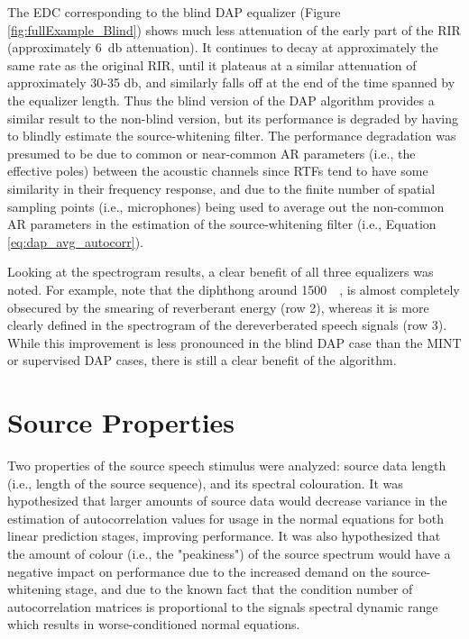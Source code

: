 The EDC corresponding to the blind DAP equalizer (Figure \ref{fig:fullExample_Blind}) shows much less attenuation of the early part of the RIR (approximately \qty{6}{\decibel} attenuation). It continues to decay at approximately the same rate as the original RIR, until it plateaus at a similar attenuation of approximately 30-35 \unit{\decibel}, and similarly falls off at the end of the time spanned by the equalizer length. Thus the blind version of the DAP algorithm provides a similar result to the non-blind version, but its performance is degraded by having to blindly estimate the source-whitening filter. The performance degradation was presumed to be due to common or near-common AR parameters (i.e., the effective poles) between the acoustic channels since RTFs tend to have some similarity in their frequency response, and due to the finite number of spatial sampling points (i.e., microphones) being used to average out the non-common AR parameters in the estimation of the source-whitening filter (i.e., Equation \ref{eq:dap_avg_autocorr}).

Looking at the spectrogram results, a clear benefit of all three equalizers was noted. For example, note that the diphthong around \qty{1500}{\milli\sec}, is almost completely obsecured by the smearing of reverberant energy (row 2), whereas it is more clearly defined in the spectrogram of the dereverberated speech signals (row 3). While this improvement is less pronounced in the blind DAP case than the MINT or supervised DAP cases, there is still a clear benefit of the algorithm.




\section{Source Properties}

Two properties of the source speech stimulus were analyzed: source data length (i.e., length of the source sequence), and its spectral colouration. It was hypothesized that larger amounts of source data would decrease variance in the estimation of autocorrelation values for usage in the normal equations for both linear prediction stages, improving performance. It was also hypothesized that the amount of colour (i.e., the "peakiness") of the source spectrum would have a negative impact on performance due to the increased demand on the source-whitening stage, and due to the known fact that the condition number of autocorrelation matrices is proportional to the signals spectral dynamic range which results in worse-conditioned normal equations.

